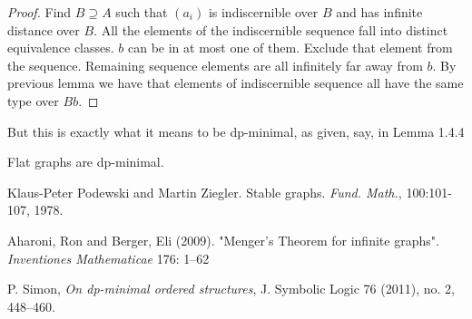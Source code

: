 \documentclass{amsart}
\begin{document}
\begin{proof}
	Find $B \supseteq A$ such that $(a_i)$ is indiscernible over $B$ and has infinite distance over $B$. All the elements of the indiscernible sequence fall into distinct equivalence classes. $b$ can be in at most one of them. Exclude that element from the sequence. Remaining sequence elements are all infinitely far away from $b$. By previous lemma we have that elements of indiscernible sequence all have the same type over $Bb$.
\end{proof}

But this is exactly what it means to be dp-minimal, as given, say, in \cite{simon_dp_minimal} Lemma 1.4.4

\begin{Corollary}
	Flat graphs are dp-minimal.
\end{Corollary}


\begin{thebibliography}{9}

	Klaus-Peter Podewski and Martin Ziegler. Stable graphs. \textit{Fund. Math.}, 100:101-107, 1978.

	Aharoni, Ron and Berger, Eli (2009). "Menger's Theorem for infinite graphs". \textit{Inventiones Mathematicae} 176: 1–62
	
	P. Simon, \textit{On dp-minimal ordered structures}, J. Symbolic Logic 76 (2011), no. 2, 448–460.


\end{thebibliography}
\end{document}
